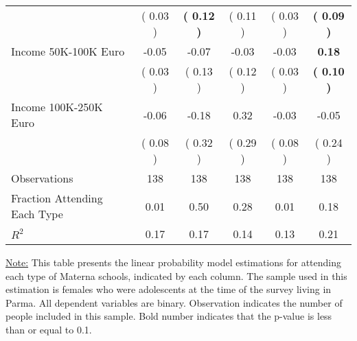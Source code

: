 \begin{table}[H]
{\begin{tabular}{lccccc}
\quad  & (     0.03 ) & \textbf{(     0.12 )}  & (     0.11 )  & (     0.03 ) & \textbf{(     0.09 )} \\
\quad Income 50K-100K Euro &     -0.05 &     -0.07 &     -0.03 &     -0.03 & \textbf{     0.18} \\
\quad  & (     0.03 ) & (     0.13 )  & (     0.12 )  & (     0.03 ) & \textbf{(     0.10 )} \\
\quad Income 100K-250K Euro &     -0.06 &     -0.18 &      0.32 &     -0.03 &     -0.05 \\
\quad  & (     0.08 ) & (     0.32 )  & (     0.29 )  & (     0.08 ) & (     0.24 ) \\
\midrule
Observations & 138 & 138 & 138 & 138 & 138 \\
Fraction Attending Each Type &      0.01 &      0.50 &      0.28 &      0.01 &      0.18 \\
\midrule
$ R^2$ &      0.17 &      0.17 &      0.14 &      0.13 &      0.21 \\
\bottomrule
\end{tabular}}
\end{table}
\begin{footnotesize}
\noindent\underline{Note:} This table presents the linear probability model estimations for attending each type of Materna schools, indicated by each column. The sample used in this estimation is females who were adolescents at the time of the survey living in Parma. All dependent variables are binary. Observation indicates the number of people included in this sample. Bold number indicates that the p-value is less than or equal to 0.1.
\end{footnotesize}
